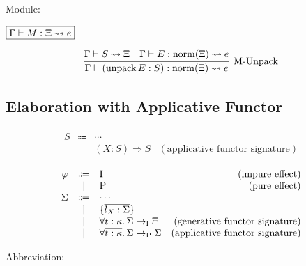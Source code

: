 Module:

$\fbox{$\Gamma \vdash M: \Xi \rightsquigarrow e$}$

\begin{gather*}
  \infer[\text{M-Unpack}]{\Gamma \vdash (\symunpack E: S): \symnorm(\Xi) \elaborate e}{
    \Gamma \vdash S \elaborate \Xi
    &
    \Gamma \vdash E: \symnorm(\Xi) \elaborate e
  }
\end{gather*}

\subsection{Elaboration with Applicative Functor}

\begin{align*}
  \begin{array}{rclr}
  S
  & \Coloneq & \cdots \\
  & \mid & (X: S) \Rightarrow S &(\text{applicative functor signature})
  \end{array}
\end{align*}

\newcommand*{\symP}{\mathrm{P}}
\newcommand*{\symI}{\mathrm{I}}

\begin{align*}
  \begin{array}{rclr}
  \varphi
  & \Coloneq & \symI &(\text{impure effect}) \\
  & \mid & \symP &(\text{pure effect}) \\
  \Sigma
  & \Coloneq & \cdots \\
  & \mid & \{\overline{l_X: \Sigma}\} \\
  & \mid & \forall \overline{t: \kappa}\ldotp \Sigma \to_\symI \Xi &(\text{generative functor signature}) \\
  & \mid & \forall \overline{t: \kappa}\ldotp \Sigma \to_\symP \Sigma &(\text{applicative functor signature})
  \end{array}
\end{align*}

Abbreviation:

